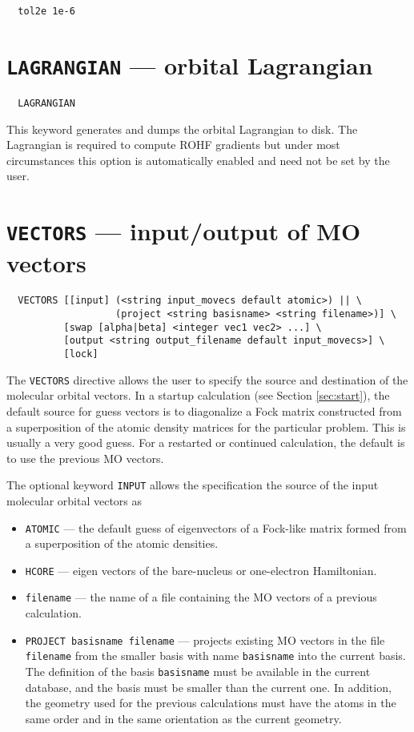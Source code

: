 \begin{verbatim}
  tol2e 1e-6
\end{verbatim}

\section{{\tt LAGRANGIAN} --- orbital Lagrangian}

\begin{verbatim}
  LAGRANGIAN
\end{verbatim}

This keyword generates and dumps the orbital Lagrangian to disk. The
Lagrangian is required to compute ROHF gradients but under most
circumstances this option is automatically enabled and need not be set
by the user.

\section{{\tt VECTORS} --- input/output of MO vectors}
\label{sec:vectors}


\begin{verbatim}
  VECTORS [[input] (<string input_movecs default atomic>) || \
                   (project <string basisname> <string filename>)] \
          [swap [alpha|beta] <integer vec1 vec2> ...] \
          [output <string output_filename default input_movecs>] \
          [lock]
\end{verbatim}

The \verb+VECTORS+ directive allows the user to specify the source and
destination of the molecular orbital vectors.  In a startup
calculation (see Section \ref{sec:start}), the default source for
guess vectors is to diagonalize a Fock matrix constructed from a
superposition of the atomic density matrices for the particular
problem.  This is usually a very good guess.  For a restarted or
continued calculation, the default is to use the previous MO vectors.

The optional keyword \verb+INPUT+ allows the specification the source
of the input molecular orbital vectors as
\begin{itemize}
\item \verb+ATOMIC+ --- the default guess of eigenvectors of a Fock-like
  matrix formed from a superposition of the atomic densities.
\item \verb+HCORE+ --- eigen vectors of the bare-nucleus or
  one-electron Hamiltonian.
\item \verb+filename+ --- the name of a file containing the MO
  vectors of a previous calculation.
\item \verb+PROJECT basisname filename+ --- projects existing MO
  vectors in the file \verb+filename+ from the smaller basis with name
  \verb+basisname+ into the current basis.  The definition of the
  basis \verb+basisname+ must be available in the current database,
  and the basis must be smaller than the current one.  In addition,
  the geometry used for the previous calculations must have the atoms
  in the same order and in the same orientation as the current
  geometry.
\end{itemize}
 
